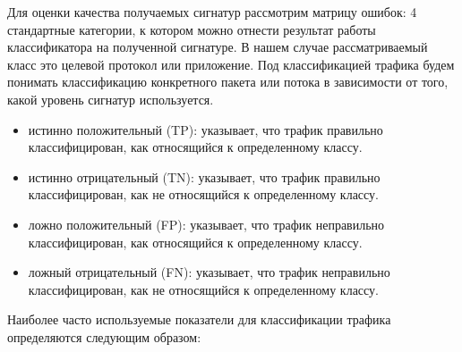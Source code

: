 Для оценки качества получаемых сигнатур рассмотрим матрицу ошибок: 4 стандартные категории, к котором можно отнести результат работы классификатора на полученной сигнатуре.
В нашем случае рассматриваемый класс это целевой протокол или приложение.
Под классификацией трафика будем понимать классификацию конкретного пакета или потока в зависимости от того, какой уровень сигнатур используется.

\begin{table}[H]
\centering
{}
\end{table}

\begin{itemize}
    \item истинно положительный (TP): указывает, что трафик правильно классифицирован, как относящийся к определенному классу.
    \item истинно отрицательный (TN): указывает, что трафик правильно классифицирован, как не относящийся к определенному классу.
    \item ложно положительный (FP): указывает, что трафик неправильно классифицирован, как относящийся к определенному классу.
    \item ложный отрицательный (FN): указывает, что трафик неправильно классифицирован, как не относящийся к определенному классу.
\end{itemize}

Наиболее часто используемые показатели для классификации трафика определяются следующим образом:

